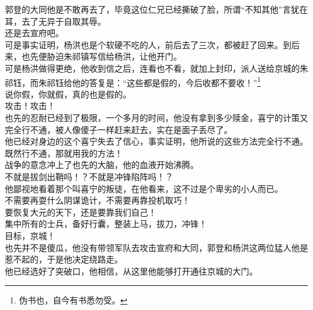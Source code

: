\begin{multicols}{\theparacolNo}
郭登的大同他是不敢再去了，毕竟这位仁兄已经撕破了脸，所谓“不知其他”言犹在耳，去了无异于自取其辱。\\

还是去宣府吧。\\

可是事实证明，杨洪也是个软硬不吃的人，前后去了三次，都被赶了回来。到后来，也先便胁迫朱祁镇写信给杨洪，让他开门。\\

可是杨洪做得更绝，他收到信之后，连看也不看，就加上封印，派人送给京城的朱祁钰，而朱祁钰给他的答复是：“这些都是假的，今后收都不要收！”\footnote{伪书也，自今有书悉勿受。}\\

说你假，你就假，真的也是假的。\\

攻击！攻击！\\

也先的忍耐已经到了极限，一个多月的时间，他没有拿到多少赎金，喜宁的计策又完全行不通，被人像傻子一样赶来赶去，实在是面子丢尽了。\\

他已经对身边的这个喜宁失去了信心，事实证明，他所说的这些方法完全行不通。\\

既然行不通，那就用我的方法！\\

战争的意念冲上了也先的大脑，他的血液开始沸腾。\\

不就是拔剑出鞘吗！？不就是冲锋陷阵吗！？\\

他鄙视地看着那个叫喜宁的叛徒，在他看来，这不过是个卑劣的小人而已。\\

不需要再耍什么阴谋诡计，不需要再靠投机取巧！\\

要恢复大元的天下，还是要靠我们自己！\\

集中所有的士兵，备好行囊，整装上马，拔刀，冲锋！\\

目标，京城！\\

也先并不是傻瓜，他没有带领军队去攻击宣府和大同，郭登和杨洪这两位猛人他是惹不起的，于是他决定绕路走。\\

他已经选好了突破口，他相信，从这里他能够打开通往京城的大门。\\


\end{multicols}
